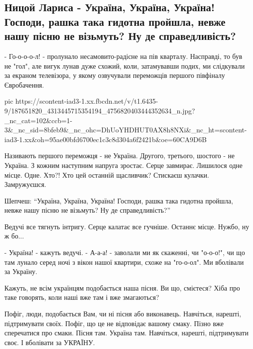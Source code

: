  
 
 
 
 
\subsection{Ницой Лариса - Україна, Україна, Україна! Господи, рашка така
гидотна пройшла, невже нашу пісню не візьмуть? Ну де справедливість?}

- Го-о-о-о-л! - пролунало несамовито-радісне на пів кварталу.  Насправді, то
був не "гол", але вигук лунав дуже схожий, коли, затамувавши подих, ми
слідкували за екраном телевізора, у якому озвучували переможців першого
півфіналу Євробачення. 

\ifcmt
  pic https://scontent-iad3-1.xx.fbcdn.net/v/t1.6435-9/187651820_4313445715354194_4756820403444352634_n.jpg?_nc_cat=102&ccb=1-3&_nc_sid=8bfeb9&_nc_ohc=DhUoYHDHUT0AX8h8NXi&_nc_ht=scontent-iad3-1.xx&oh=95ae00bfd6700ec1c3c8d304a6f2421b&oe=60CA9D6B
\fi


Називають першого переможця - не Україна. Другого, третього, шостого - не
Україна. З кожним наступним напруга зростає. Серце завмирає. Лишилося одне
місце. Одне. Хто?! Хто цей останній щасливчик? Стискаєш кулачки. Замружуєшся.

Шепчеш: \enquote{Україна, Україна, Україна! Господи, рашка така гидотна пройшла, невже
нашу пісню не візьмуть? Ну де справедливість?}

Ведучі все тягнуть інтригу. Серце калатає все гучніше. Останнє місце. Нужбо, ну ж бо...

- Україна! - кажуть ведучі.
- А-а-а! - заволали ми як скаженні, чи "о-о-о!", чи що там лунало серед ночі з
вікон нашої квартири, схоже на "го-о-ол". Ми вболівали за Україну.

Кажуть, не всім українцям подобається наша пісня. Ви що, смієтеся? Хіба про
таке говорять, коли наші вже там і вже змагаються? 

Пофіг, люди, подобається Вам, чи ні пісня або виконавець. Навчіться, нарешті,
підтримувати своїх. Пофіг, що це не відповідає вашому смаку. Пізно вже
сперечатися про смаки. Пісня там. Україна там. Навчіться, нарешті,
підтримувати своє. І вболівати за УКРАЇНУ. 

